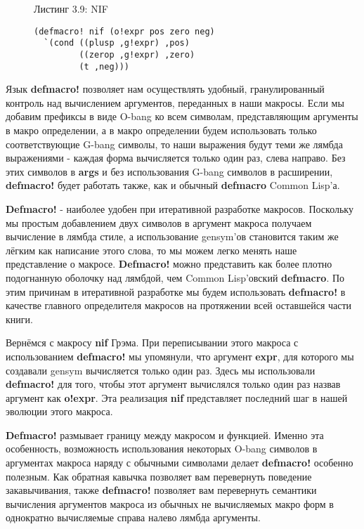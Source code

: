 \begin{figure}Листинг 3.9: NIF\label{listing_3.9}
\listbegin
\begin{verbatim}
(defmacro! nif (o!expr pos zero neg)
  `(cond ((plusp ,g!expr) ,pos)
         ((zerop ,g!expr) ,zero)
         (t ,neg)))
\end{verbatim}
\listend
\end{figure}

Язык \textbf{defmacro!} позволяет нам осуществлять удобный, гранулированный контроль над вычислением аргументов, переданных в наши макросы. Если мы добавим префиксы в виде O-bang ко всем символам, представляющим аргументы в макро определении, а в макро определении будем использовать только соответствующие G-bang символы, то наши выражения будут теми же лямбда выражениями - каждая форма вычисляется только один раз, слева направо. Без этих символов в \textbf{args} и без использования G-bang символов в расширении, \textbf{defmacro!} будет работать также, как и обычный \textbf{defmacro} Common Lisp'а.

\textbf{Defmacro!} - наиболее удобен при итеративной разработке макросов. Поскольку мы простым добавлением двух символов в аргумент макроса получаем вычисление в лямбда стиле, а использование gensym'ов становится таким же лёгким как написание этого слова, то мы можем легко менять наше представление о макросе. \textbf{Defmacro!} можно представить как более плотно подогнанную оболочку над лямбдой, чем Common Lisp'овский \textbf{defmacro}. По этим причинам в итеративной разработке мы будем использовать \textbf{defmacro!} в качестве главного определителя макросов на протяжении всей оставшейся части книги.

Вернёмся с макросу \textbf{nif} Грэма. При переписывании этого макроса с использованием \textbf{defmacro!} мы упомянули, что аргумент \textbf{expr}, для которого мы создавали gensym вычисляется только один раз. Здесь мы использовали \textbf{defmacro!} для того, чтобы этот аргумент вычислялся только один раз назвав аргумент как \textbf{o!expr}. Эта реализация \textbf{nif} представляет последний шаг в нашей эволюции этого макроса.

\textbf{Defmacro!} размывает границу между макросом и функцией. Именно эта особенность, возможность использования некоторых O-bang символов в аргументах макроса наряду с обычными символами делает {\textbf{defmacro!}} особенно полезным. Как обратная кавычка позволяет вам перевернуть поведение закавычивания, также \textbf{defmacro!} позволяет вам перевернуть семантики вычисления аргументов макроса из обычных не вычисляемых макро форм в однократно вычисляемые справа налево лямбда аргументы.

